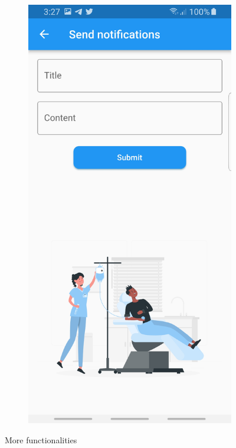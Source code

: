 \begin{figure}[H]
\begin{subfigure}{.31\textwidth}
  \label{fig:sub-first}
\end{subfigure}
\begin{subfigure}{.31\textwidth}
  \centering
  \includegraphics[width=1\linewidth]{images1/sendnotification.jpg}  
  \label{fig:sub-second}
\end{subfigure}


\caption{More functionalities}
\label{fig:fig}
\end{figure}





